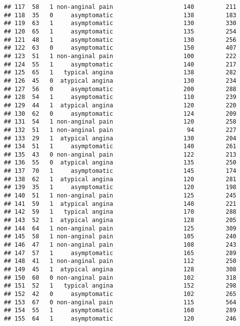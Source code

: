 \documentclass[]{article}
\begin{document}
\begin{verbatim}
## 117  58   1 non-anginal pain                    140         211
## 118  35   0     asymptomatic                    138         183
## 119  63   1     asymptomatic                    130         330
## 120  65   1     asymptomatic                    135         254
## 121  48   1     asymptomatic                    130         256
## 122  63   0     asymptomatic                    150         407
## 123  51   1 non-anginal pain                    100         222
## 124  55   1     asymptomatic                    140         217
## 125  65   1   typical angina                    138         282
## 126  45   0  atypical angina                    130         234
## 127  56   0     asymptomatic                    200         288
## 128  54   1     asymptomatic                    110         239
## 129  44   1  atypical angina                    120         220
## 130  62   0     asymptomatic                    124         209
## 131  54   1 non-anginal pain                    120         258
## 132  51   1 non-anginal pain                     94         227
## 133  29   1  atypical angina                    130         204
## 134  51   1     asymptomatic                    140         261
## 135  43   0 non-anginal pain                    122         213
## 136  55   0  atypical angina                    135         250
## 137  70   1     asymptomatic                    145         174
## 138  62   1  atypical angina                    120         281
## 139  35   1     asymptomatic                    120         198
## 140  51   1 non-anginal pain                    125         245
## 141  59   1  atypical angina                    140         221
## 142  59   1   typical angina                    170         288
## 143  52   1  atypical angina                    128         205
## 144  64   1 non-anginal pain                    125         309
## 145  58   1 non-anginal pain                    105         240
## 146  47   1 non-anginal pain                    108         243
## 147  57   1     asymptomatic                    165         289
## 148  41   1 non-anginal pain                    112         250
## 149  45   1  atypical angina                    128         308
## 150  60   0 non-anginal pain                    102         318
## 151  52   1   typical angina                    152         298
## 152  42   0     asymptomatic                    102         265
## 153  67   0 non-anginal pain                    115         564
## 154  55   1     asymptomatic                    160         289
## 155  64   1     asymptomatic                    120         246

\end{verbatim}
\end{document}
